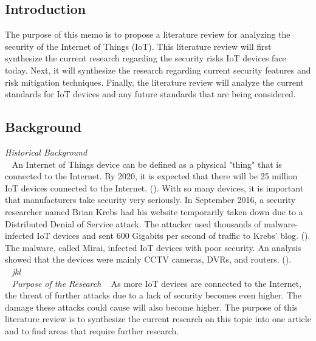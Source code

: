 \documentclass[letterpaper, 12pt]{texMemo}
\begin{document}
\maketitle
\begin{flushleft}
\subsection*{Introduction}
The purpose of this memo is to propose a literature review for analyzing the security of the Internet of Things (IoT). 
This literature review will first synthesize the current research regarding the security risks IoT devices face today. 
Next, it will synthesize the research regarding current security features and risk mitigation techniques.  
Finally, the literature review will analyze the current standards for IoT devices and any future standards that are being considered.  

\subsection*{Background}
\textit{Historical Background}\\ 
~\newline
An Internet of Things device can be defined as a physical "thing" that is connected to the Internet. By 2020, it is expected that there will be 
25 million IoT devices connected to the Internet. (\cite{Martinez1}). With so many devices, it is important that manufacturers take security very seriously. 
In September 2016, a security researcher named Brian Krebs had his website temporarily taken down due to a Distributed Denial of Service attack. The attacker
used thousands of malware-infected IoT devices and sent 600 Gigabits per second of traffic to Krebs' blog. (\cite{Krebs}). The malware, called Mirai, 
infected IoT devices with poor security. An analysis showed that the devices were mainly CCTV cameras, DVRs, and routers. (\cite{Incapsula}).\\
~\newline
\textit{jkl}\\
~\newline
\textit{Purpose of the Research}
~\newline
As more IoT devices are connected to the Internet, the threat of further attacks due to a lack of security becomes even higher. The damage these attacks could
cause will also become higher. The purpose of this literature review is to synthesize the current research on this topic into one article and to find areas that require 
further research.\\
~\newline


\end{flushleft}
\end{document}
